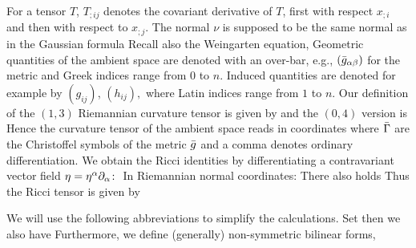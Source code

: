 For a tensor $T$, $T_{;ij}$ denotes the covariant derivative of $T$, first with respect $x_{;i}$ and then with respect to $x_{;j}.$ The normal $\nu$ is supposed to be the same normal as in the Gaussian formula
Recall also the Weingarten equation,
Geometric quantities of the ambient space are denoted with an over-bar, e.g., $(\-g_{\a\b})$ for the metric and Greek indices range from $0$ to $n.$ Induced quantities are denoted for example by $(g_{ij})$, $(h_{ij}),$ where Latin indices range from $1$ to $n.$
Our definition of the $(1,3)$ Riemannian curvature tensor is given by
and the $(0,4)$ version is
Hence the curvature tensor of the ambient space reads in coordinates
where $\-\G$ are the Christoffel symbols of the metric $\-g$ and a comma denotes ordinary differentiation.
We obtain the Ricci identities by differentiating a contravariant vector field $\eta=\eta^{\a}\del_{\a}\cn$
In Riemannian normal coordinates:
There also holds
Thus the Ricci tensor is given by

We will use the following abbreviations to simplify the calculations. Set
then we also have
Furthermore, we define (generally) non-symmetric bilinear forms,

